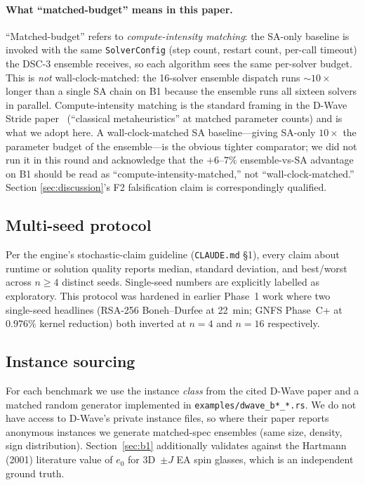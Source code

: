 \documentclass[11pt,a4paper]{article}
\begin{document}
\paragraph{What ``matched-budget'' means in this paper.}
``Matched-budget'' refers to \emph{compute-intensity matching}: the
SA-only baseline is invoked with the same \texttt{SolverConfig}
(step count, restart count, per-call timeout) the DSC-3 ensemble
receives, so each algorithm sees the same per-solver budget. This is
\emph{not} wall-clock-matched: the 16-solver ensemble dispatch runs
$\sim\!10\times$ longer than a single SA chain on B1 because the
ensemble runs all sixteen solvers in parallel. Compute-intensity
matching is the standard framing in the D-Wave Stride
paper~\cite{booth_stride_2024} (``classical metaheuristics'' at
matched parameter counts) and is what we adopt here. A
wall-clock-matched SA baseline---giving SA-only $10\times$ the
parameter budget of the ensemble---is the obvious tighter
comparator; we did not run it in this round and acknowledge that the
$+6$--$7\%$ ensemble-vs-SA advantage on B1 should be read as
``compute-intensity-matched,'' not ``wall-clock-matched.'' Section
\ref{sec:discussion}'s F2 falsification claim is correspondingly
qualified.

\subsection{Multi-seed protocol}

Per the engine's stochastic-claim guideline (\texttt{CLAUDE.md} §1),
every claim about runtime or solution quality reports median, standard
deviation, and best/worst across $n\!\ge\!4$ distinct seeds. Single-seed
numbers are explicitly labelled as exploratory. This protocol was hardened
in earlier Phase~1 work where two single-seed headlines (RSA-256
Boneh--Durfee at 22~min; GNFS Phase~C+ at $0.976\%$ kernel reduction)
both inverted at $n\!=\!4$ and $n\!=\!16$ respectively.

\subsection{Instance sourcing}

For each benchmark we use the instance \emph{class} from the cited D-Wave
paper and a matched random generator implemented in
\texttt{examples/dwave\_b*\_*.rs}. We do not have access to D-Wave's
private instance files, so where their paper reports anonymous instances
we generate matched-spec ensembles (same size, density, sign distribution).
Section~\ref{sec:b1} additionally validates against the Hartmann (2001)
literature value of $e_0$ for 3D~$\pm J$ EA spin glasses, which is an
independent ground truth.
\end{document}

